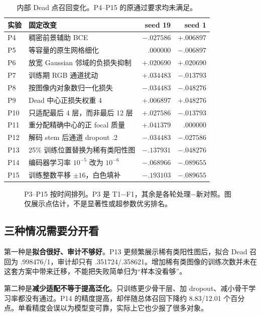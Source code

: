 \documentclass[UTF8,zihao=-4,fontset=windows]{ctexart}
\begin{document}
\begin{table}[H]\centering\small
\begin{tabularx}{\linewidth}{p{12mm}Xrr}\toprule
实验 & 固定改变 & seed 19 & seed 1\\\midrule
P4 & 稠密前景辅助 BCE & $-.027586$ & $+.006897$\\
P5 & 等容量的原生网格细化 & $.000000$ & $-.006897$\\
P6 & 放宽 Gaussian 邻域的负损失抑制 & $+.020690$ & $+.020690$\\
P7 & 训练期 RGB 通道扰动 & $+.034483$ & $-.013793$\\
P8 & 按图像内对象数归一化损失 & $-.034483$ & $-.048276$\\
P9 & Dead 中心正损失权重 4 & $+.006897$ & $+.048276$\\
P10 & 只适配最后 4 层，而非最后 12 层 & $+.027586$ & $-.013793$\\
P11 & 重分配精确中心的正 focal 质量 & $+.041379$ & $.000000$\\
P12 & 解码 stem 后通道 dropout .2 & $-.034483$ & $-.027586$\\
P13 & 25\% 训练位置替换为稀有类阳性图 & $-.137931$ & $-.048276$\\
P14 & 编码器学习率 $10^{-5}$ 改为 $10^{-6}$ & $-.068966$ & $-.089655$\\
P15 & 训练整数平移 $\pm16$，白色填补 & $-.193103$ & $-.089655$\\\bottomrule
\end{tabularx}
\caption{内部 Dead 点召回变化。P4--P15 的原通过要求均未满足。}
\end{table}

\begin{figure}[H]\centering
\caption{P3--P15 按时间排列。P3 是 T1$-$F1，其余是各轮处理$-$新对照。图仅展示点估计，不是显著性或超参数优劣排名。}
\end{figure}

\subsection{三种情况需要分开看}

第一种是\textbf{拟合很好、审计不够好}。P13 更频繁展示稀有类阳性图后，拟合 Dead 召回为 .998476/1，审计却只有 .351724/.358621。增加稀有类图像的训练次数并未在这套方案中带来迁移，不能把失败简单归为“样本没看够”。

第二种是\textbf{减少适配不等于提高泛化}。只训练更少骨干层、加 dropout、减小骨干学习率都没有通过。P14 的精度提高，却伴随总体召回下降约 8.83/12.01 个百分点。单看精度会误以为模型变可靠，实际上它也少报了很多对象。
\end{document}
